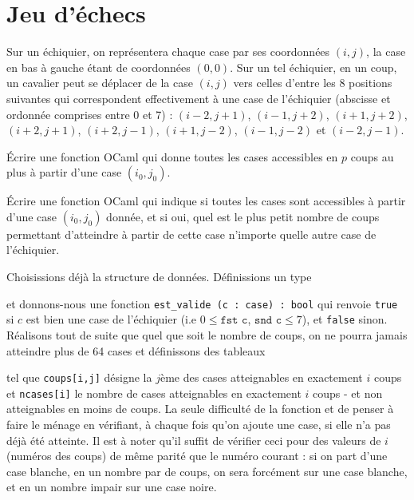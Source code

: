 \renewcommand{\SourceFile}{1-parcours-de-tableaux/src/1-1.ml}

\section{Jeu d'échecs}

Sur un échiquier, on représentera chaque case par ses coordonnées $(i, j)$, la case en bas à gauche étant de coordonnées $(0, 0)$. Sur un tel échiquier, en un coup, un cavalier peut se déplacer de la case $(i, j)$ vers celles d'entre les 8 positions suivantes qui correspondent effectivement à une case de l'échiquier (abscisse et ordonnée comprises entre 0 et 7) : $(i-2, j+1)$, $(i-1, j+2)$, $(i+1, j+2)$, $(i+2, j+1)$, $(i+2, j -1)$, $(i+1, j-2)$, $(i-1, j-2)$ et $(i-2,j-1)$.

\Q
Écrire une fonction OCaml qui donne toutes les cases accessibles en $p$ coups au plus à partir d'une case $(i_0, j_0)$.

\Q
Écrire une fonction OCaml qui indique si toutes les cases sont accessibles à partir d'une case $(i_0, j_0)$ donnée, et si oui, quel est le plus petit nombre de coups permettant d'atteindre à partir de cette case n'importe quelle autre case de l'échiquier.

\Corrige

\Q
Choisissions déjà la structure de données. Définissions un type



et donnons-nous une fonction \texttt{est\_valide (c : case) : bool} qui renvoie \texttt{true} si $c$ est bien une case de l'échiquier (i.e $0\leq \texttt{fst c}$, $\texttt{snd c} \leq 7$), et \texttt{false} sinon. Réalisons tout de suite que quel que soit le nombre de coups, on ne pourra jamais atteindre plus de 64 cases et définissons des tableaux



tel que \texttt{coups[i,j]} désigne la $j$ème des cases atteignables en exactement $i$ coups et \texttt{ncases[i]} le nombre de cases atteignables en exactement $i$ coups - et non atteignables en moins de coups. La seule difficulté de la fonction et de penser à \og faire le ménage \fg en vérifiant, à chaque fois qu'on ajoute une case, si elle n'a pas déjà été atteinte. Il est à noter qu'il suffit de vérifier ceci pour des valeurs de $i$ (numéros des coups) de même parité que le numéro courant : si on part d'une case blanche, en un nombre par de coups, on sera forcément sur une case blanche, et en un nombre impair sur une case noire.

